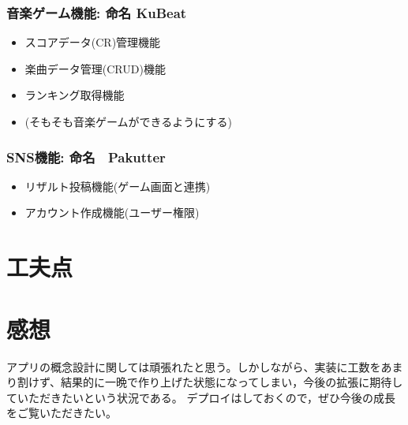 \documentclass[a4j]{jarticle}
\begin{document}
\subsubsection*{音楽ゲーム機能: 命名 KuBeat}
\begin{itemize}
  \item スコアデータ(CR)管理機能
  \item 楽曲データ管理(CRUD)機能
  \item ランキング取得機能
  \item (そもそも音楽ゲームができるようにする)
\end{itemize}
\subsubsection*{SNS機能: 命名　Pakutter}
\begin{itemize}  
  \item リザルト投稿機能(ゲーム画面と連携)
  \item アカウント作成機能(ユーザー権限)
\end{itemize}

\section{工夫点}

\section{感想}
アプリの概念設計に関しては頑張れたと思う。しかしながら、実装に工数をあまり割けず、結果的に一晩で作り上げた状態になってしまい，今後の拡張に期待していただきたいという状況である。
デプロイはしておくので，ぜひ今後の成長をご覧いただきたい。
\end{document}
